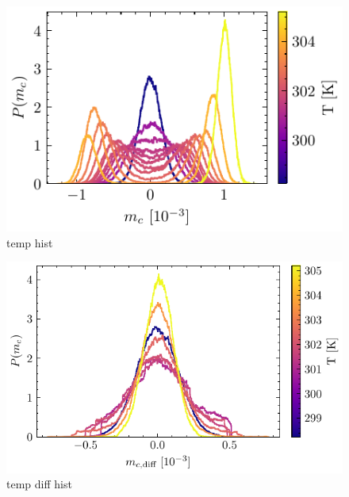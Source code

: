 \documentclass[main.tex]{subfiles}
\begin{document}
\begin{figure}[H]
    \centering
    \includegraphics{bilder/plots/temp_comparison_long/mc_hist.pdf}
    \caption{temp hist}\label{fig:temp-hist}    
\end{figure}

\begin{figure}[H]
    \centering
    \includegraphics{bilder/plots/temp_comparison_long/mc_diff_hist.pdf}
    \caption{temp diff hist}\label{fig:temp-diff-hist}    
\end{figure}
\end{document}
